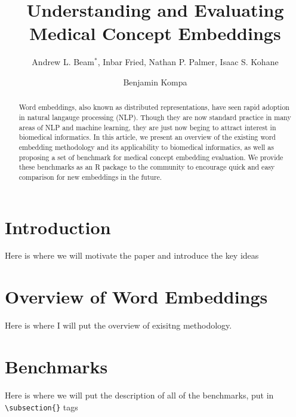 \documentclass{ws-procs11x85}
\begin{document}
\title{Understanding and Evaluating Medical Concept Embeddings}

\author{Andrew L. Beam$^*$, Inbar Fried, Nathan P. Palmer, Isaac S. Kohane}

\address{Department of Biomedical Informatics, Harvard Medical School,\\
Boston, MA, 02115, USA\\
$^*$E-mail: Andrew\_Beam@hms.harvard.edu\\
www.university\_name.edu}

\author{Benjamin Kompa}

\address{University of North Carolina, Chapel Hill,\\
Chapel Hill, North Carolina ZIP/Zone, USA\\
E-mail: an\_author@laboratory.com}

\begin{abstract}
Word embeddings, also known as distributed representations, have seen rapid adoption in natural langauge processing (NLP). Though they are now standard practice in many areas of NLP and machine learning, they are just now beging to attract interest in biomedical informatics. In this article, we present an overview of the existing word embedding methodology and its applicability to biomedical informatics, as well as proposing a set of benchmark for medical concept embedding evaluation. We provide these benchmarks as an R package to the community to encourage quick and easy comparison for new embeddings in the future.
\end{abstract}


\bodymatter

\section{Introduction}\label{aba:intro}
Here is where we will motivate the paper and introduce the key ideas

\section{Overview of Word Embeddings}\label{aba:intro}
Here is where I will put the overview of exisitng methodology.

\section{Benchmarks}
Here is where we will put the description of all of the benchmarks, put in \verb|\subsection{}| tags
\end{document}
